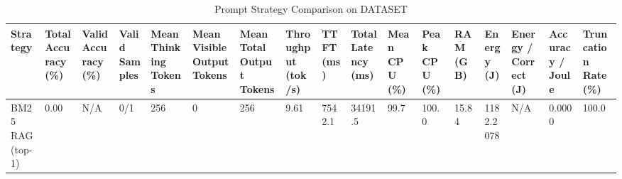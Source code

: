 \begin{table}
\caption{Prompt Strategy Comparison on DATASET}
\label{tab:strategy_comparison}
\begin{tabular}{lllllllllllllllll}
\toprule
Strategy & Total Accuracy (\%) & Valid Accuracy (\%) & Valid Samples & Mean Thinking Tokens & Mean Visible Output Tokens & Mean Total Output Tokens & Throughput (tok/s) & TTFT (ms) & Total Latency (ms) & Mean CPU (\%) & Peak CPU (\%) & RAM (GB) & Energy (J) & Energy / Correct (J) & Accuracy / Joule & Truncation Rate (\%) \\
\midrule
BM25 RAG (top-1) & 0.00 & N/A & 0/1 & 256 & 0 & 256 & 9.61 & 7542.1 & 34191.5 & 99.7 & 100.0 & 15.84 & 1182.2078 & N/A & 0.0000 & 100.0 \\
\bottomrule
\end{tabular}
\end{table}
